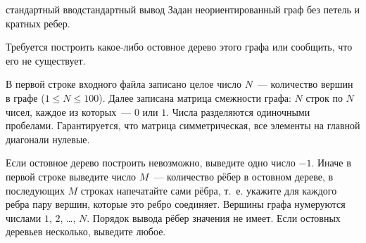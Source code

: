\begin{rawproblem}{стандартный ввод}{стандартный вывод}
Задан неориентированный граф без петель и кратных ребер.

Требуется построить какое-либо остовное дерево этого графа или сообщить, что его не существует.

\InputFile
В первой строке входного файла записано целое число $N$~--- количество вершин в графе ($1 \le N \le 100$). Далее записана матрица смежности графа: $N$ строк по $N$ чисел, каждое из которых~--- $0$ или $1$. Числа разделяются одиночными пробелами. Гарантируется, что матрица симметрическая, все элементы на главной диагонали нулевые.

\OutputFile
Если остовное дерево построить невозможно, выведите одно число $-1$. Иначе в первой строке выведите число $M$~--- количество рёбер в остовном дереве, в последующих $M$ строках напечатайте сами рёбра, т.~е. укажите для каждого ребра пару вершин, которые это ребро соединяет. Вершины графа нумеруются числами $1$, $2$, \ldots, $N$. Порядок вывода рёбер значения не имеет. Если остовных деревьев несколько, выведите любое.

\Examples
\begin{example}
%
%
\end{example}

\end{rawproblem}
